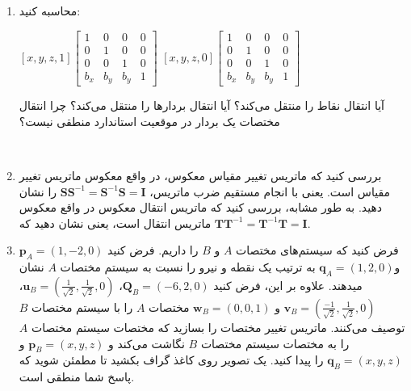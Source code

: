 {\begin{spacing}{1.5}
\begin{enumerate}[label=\textbf{\arabic*}.]
            \item { محاسبه کنید:
                \begin{center}
                    $[x, y, z, 1]\begin{bmatrix}
                                     1     & 0     & 0     & 0 \\
                                     0     & 1     & 0     & 0 \\
                                     0     & 0     & 1     & 0 \\
                                     b_{x} & b_{y} & b_{y} & 1
                    \end{bmatrix}$ \hspace{5 mm}
                    $[x, y, z, 0]\begin{bmatrix}
                                     1     & 0     & 0     & 0 \\
                                     0     & 1     & 0     & 0 \\
                                     0     & 0     & 1     & 0 \\
                                     b_{x} & b_{y} & b_{y} & 1
                    \end{bmatrix}$
                \end{center}
                آیا انتقال نقاط را منتقل می‌کند؟ آیا انتقال بردارها را منتقل می‌کند؟ چرا انتقال مختصات یک بردار در موقعیت استاندارد منطقی نیست؟
            } \\\textbf{\vspace{6pt}}

            \item {بررسی کنید که ماتریس تغییر مقیاس معکوس، در واقع معکوس ماتریس تغییر مقیاس است.
            یعنی با انجام مستقیم ضرب ماتریس، $\textbf{SS}^{-1}=\textbf{S}^{-1}\textbf{S}=\textbf{I}$ را نشان دهید.
            به طور مشابه، بررسی کنید که ماتریس انتقال معکوس در واقع معکوس ماتریس انتقال است،
            یعنی نشان دهید که $\textbf{TT}^{-1}=\textbf{T}^{-1}\textbf{T}=\textbf{I}$.} \\\textbf{\vspace{6pt}}

            \item {فرض کنید که سیستم‌های مختصات $A$ و $B$ را داریم.
            فرض کنید $\textbf{p}_{A}=(1,-2,0)$ و$\textbf{q}_{A}=(1,2,0)$ به ترتیب یک نقطه و نیرو را نسبت به سیستم مختصات $A$ نشان میدهند.
            علاوه بر این، فرض کنید $\textbf{Q}_{B}=(-6,2,0)$، $\textbf{u}_{B}=\left(\frac{\displaystyle 1}{\sqrt{\displaystyle 2}},\frac{\displaystyle 1}{\sqrt{\displaystyle 2}},0 \right)$، $\textbf{v}_{B}=\left(\frac{\displaystyle -1}{\sqrt{\displaystyle 2}},\frac{\displaystyle 1}{\sqrt{\displaystyle 2}},0 \right)$ و $\textbf{w}_{B}=(0,0,1)$ مختصات $A$ را با سیستم مختصات $B$ توصیف می‌کنند.
            ماتریس تغییر مختصات را بسازید که مختصات سیستم مختصات $A$ را به مختصات سیستم مختصات $B$ نگاشت می‌کند و $\textbf{p}_{B}=(x,y,z)$ و $\textbf{q}_{B}=(x,y,z)$ را پیدا کنید.
            یک تصویر روی کاغذ گراف بکشید تا مطمئن شوید که پاسخ شما منطقی است.} \\\textbf{\vspace{6pt}}


\end{enumerate}
\end{spacing}}
